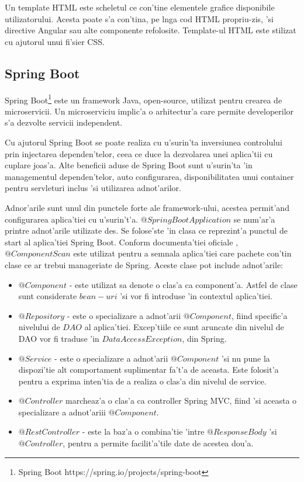 \documentclass[12pt,a4paper,twoside]{report}
\begin{document}
Un template HTML este scheletul ce con'tine elementele grafice disponibile utilizatorului. Acesta poate s'a con'tina, pe l\ia nga cod HTML propriu-zis, 'si directive Angular sau alte componente refolosite. Template-ul HTML este stilizat cu ajutorul unui fi'sier CSS.

\subsection{Spring Boot}
Spring Boot\footnote{Spring Boot https://spring.io/projects/spring-boot} este un framework Java, open-source, utilizat pentru crearea de microservicii. Un microserviciu implic'a o arhitectur'a care permite developerilor s'a dezvolte servicii independent.

Cu ajutorul Spring Boot se poate realiza cu u'surin'ta inversiunea controlului prin injectarea dependen'telor, ceea ce duce la dezvolarea unei aplica'tii cu cuplare joas'a. Alte beneficii aduse de Spring Boot sunt u'surin'ta 'in managementul dependen'telor, auto configurarea, disponibilitatea unui container pentru servleturi inclus 'si utilizarea adnot'arilor.

Adnor'arile sunt unul din punctele forte ale framework-ului, acestea permit'and configurarea aplica'tiei cu u'surin't'a. $@SpringBootApplication$ se num'ar'a printre adnot'arile utilizate des. Se folose'ste 'in clasa ce reprezint'a punctul de start al aplica'tiei Spring Boot. Conform documenta'tiei oficiale \cite{springBootCite}, $@ComponentScan$ este utilizat pentru a semnala aplica'tiei care pachete con'tin clase ce ar trebui manageriate de Spring. Aceste clase pot include adnot'arile: 

\begin{itemize}
    \item $@Component$ - este utilizat sa denote o clas'a ca component'a. Astfel de clase sunt considerate $bean-uri$ 'si vor fi introduse 'in contextul aplica'tiei.
    \item $@Repository$ - este o specializare a adnot'arii $@Component$, fiind specific'a nivelului de $DAO$ al aplica'tiei. Excep'tiile ce sunt aruncate din nivelul de DAO vor fi traduse 'in $DataAccessException$, din Spring.
    \item $@Service$ - este o specializare a adnot'arii $@Component$ 'si nu pune la dispozi'tie alt comportament suplimentar fa't'a de aceasta. Este folosit'a pentru a exprima inten'tia de a realiza o clas'a din nivelul de service.
    \item $@Controller$ marcheaz'a o clas'a ca controller Spring MVC, fiind 'si aceasta o specializare a adnot'ariii $@Component$.
    \item $@RestController$ - este la baz'a o combina'tie 'intre $@ResponseBody$ 'si $@Controller$,  pentru a permite facilit'a'tile date de acestea dou'a.
\end{itemize}
\end{document}
